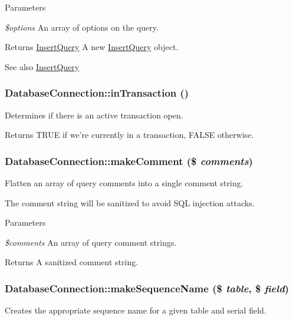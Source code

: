 \begin{DoxyParams}{Parameters}
\item[{\em \$options}]An array of options on the query.\end{DoxyParams}
\begin{DoxyReturn}{Returns}
\hyperlink{classInsertQuery}{InsertQuery} A new \hyperlink{classInsertQuery}{InsertQuery} object.
\end{DoxyReturn}
\begin{DoxySeeAlso}{See also}
\hyperlink{classInsertQuery}{InsertQuery} 
\end{DoxySeeAlso}
\hypertarget{classDatabaseConnection_ac1ff742bc653f3d67d633c3d1b256229}{
\subsubsection[{inTransaction}]{\setlength{\rightskip}{0pt plus 5cm}DatabaseConnection::inTransaction ()}}
\label{classDatabaseConnection_ac1ff742bc653f3d67d633c3d1b256229}
Determines if there is an active transaction open.

\begin{DoxyReturn}{Returns}
TRUE if we're currently in a transaction, FALSE otherwise. 
\end{DoxyReturn}
\hypertarget{classDatabaseConnection_a127563f6bb26ade0aa9480a117be0356}{
\subsubsection[{makeComment}]{\setlength{\rightskip}{0pt plus 5cm}DatabaseConnection::makeComment (\$ {\em comments})}}
\label{classDatabaseConnection_a127563f6bb26ade0aa9480a117be0356}
Flatten an array of query comments into a single comment string.

The comment string will be sanitized to avoid SQL injection attacks.


\begin{DoxyParams}{Parameters}
\item[{\em \$comments}]An array of query comment strings.\end{DoxyParams}
\begin{DoxyReturn}{Returns}
A sanitized comment string. 
\end{DoxyReturn}
\hypertarget{classDatabaseConnection_a5894f307c1cb799702449f30aa4a092b}{
\subsubsection[{makeSequenceName}]{\setlength{\rightskip}{0pt plus 5cm}DatabaseConnection::makeSequenceName (\$ {\em table}, \/  \$ {\em field})}}
\label{classDatabaseConnection_a5894f307c1cb799702449f30aa4a092b}
Creates the appropriate sequence name for a given table and serial field.

